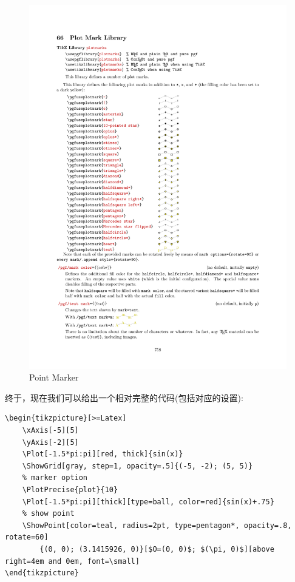\begin{figure}
    \centering
    \includegraphics[width=.95\linewidth]{./pics/point_marker.pdf}
    \caption{Point Marker}
    \label{fig:point-marker}
\end{figure}

终于，现在我们可以给出一个相对完整的代码(包括对应的设置):

\begin{verbatim}
\begin{tikzpicture}[>=Latex]
    \xAxis[-5][5]
    \yAxis[-2][5]
    \Plot[-1.5*pi:pi][red, thick]{sin(x)}
    \ShowGrid[gray, step=1, opacity=.5]{(-5, -2); (5, 5)}
    % marker option
    \PlotPrecise{plot}{10}
    \Plot[-1.5*pi:pi][thick][type=ball, color=red]{sin(x)+.75}
    % show point
    \ShowPoint[color=teal, radius=2pt, type=pentagon*, opacity=.8, rotate=60]
        {(0, 0); (3.1415926, 0)}[$O=(0, 0)$; $(\pi, 0)$][above right=4em and 0em, font=\small]
\end{tikzpicture}
\end{verbatim}

